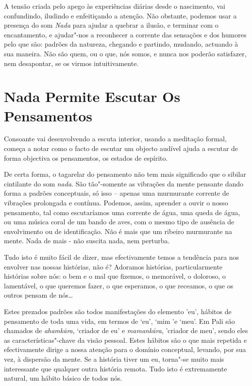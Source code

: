 A tensão criada pelo apego às experiências diárias desde o nascimento,
vai confundindo, iludindo e enfeitiçando a atenção. Não obstante,
podemos usar a presença do som \emph{Nada} para ajudar a quebrar a
ilusão, e terminar com o encantamento, e ajudar"-nos a reconhecer a
corrente das sensações e dos humores pelo que são: padrões da natureza,
chegando e partindo, mudando, actuando à sua maneira. Não são quem, ou o
que, nós somos, e nunca nos poderão satisfazer, nem desapontar, se os
virmos intuitivamente.

\section{Nada Permite Escutar Os Pensamentos}

Consoante vai desenvolvendo a escuta interior, usando a meditação
formal, começa a notar como o facto de escutar um objecto audível ajuda
a escutar de forma objectiva os pensamentos, os estados de espírito.

De certa forma, o tagarelar do pensamento não tem mais significado que o
sibilar cintilante do som \emph{nada}. São tão"-somente as vibrações da
mente pensante dando forma a padrões conceptuais, só isso -- apenas uma
murmurante corrente de vibrações prolongada e contínua. Podemos, assim,
aprender a ouvir o nosso pensamento, tal como escutaríamos uma corrente
de água, uma queda de água, ou uma música coral de um bando de aves, com
o mesmo tipo de ausência de envolvimento ou de identificação. Não é mais
que um ribeiro murmurante na mente. Nada de mais - não suscita nada, nem
perturba.

Tudo isto é muito fácil de dizer, mas efectivamente temos a tendência
para nos envolver nas nossas histórias, não é? Adoramos histórias,
particularmente histórias sobre nós: o bem e o mal que fizemos, o
memorável, o doloroso, o lamentável, o que queremos fazer, o que
esperamos, o que receamos, o que os outros pensam de nós\ldots{}

Estes prezados padrões são todos manifestações do elemento 'eu', hábitos
de pensamento de toda uma vida, em termos de `eu', `mim 'e `meu'. Em
Pali são chamados de \emph{ahamkāra}, `criador de eu' e
\emph{mamankāra}, 'criador de meu', sendo eles as características"-chave
da visão pessoal. Estes hábitos são o que mais repetida e efectivamente
dirige a nossa atenção para o domínio conceptual, levando, por sua vez,
à dispersão da mente. Se a história tiver um eu, torna"-se muito mais
interessante que qualquer outra história remota. Tudo isto é
extremamente natural, um hábito básico de todos nós.

